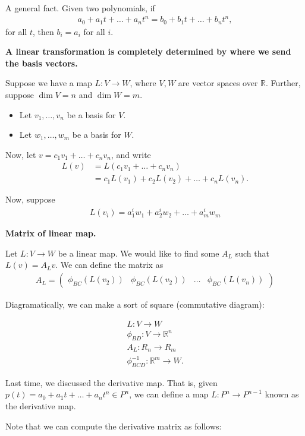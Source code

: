 \documentclass{article}
\newcommand{\mat}[1]{\begin{pmatrix}#1\end{pmatrix}}
\newcommand{\RR}{\mathbb{R}}
\begin{document}
A general fact.  Given two polynomials, if
\begin{align*}
  a_0 + a_1 t + \dots + a_n t^n = b_0 + b_1 t + \dots + b_n t^n,
\end{align*}
for all $t$, then $b_i = a_i$ for all $i$.

{\bf A linear transformation is completely determined by where we send the basis vectors.}

Suppose we have a map $L: V \to W$, where $V, W$ are vector spaces over $\RR$.  Further, suppose $\dim V = n$ and $\dim W = m$.
\begin{itemize}
  \item Let $v_1, \dots, v_n$ be a basis for $V$.
  \item Let $w_1, \dots, w_m$ be a basis for $W$.
\end{itemize}

Now, let $v = c_1 v_1 + \dots + c_n v_n$, and write
\begin{align*}
  L(v) &= L(c_1 v_1 + \dots + c_n v_n) \\
  &= c_1 L(v_1) + c_2 L(v_2) + \dots + c_n L(v_n).
\end{align*}

Now, suppose
\begin{align*}
  L(v_i) = a_1^i w_1 + a_2^i w_2 + \dots + a_m^i w_m
\end{align*}

{\bf Matrix of linear map.}

Let $L: V \to W$ be a linear map.  We would like to find some $A_L$ such that $L(v) = A_L v$.  We can define the matrix as
\begin{align*}
  A_L = \mat{\phi_{BC}(L(v_2)) & \phi_{BC}(L(v_2)) & \dots & \phi_{BC}(L(v_n))}
\end{align*}

Diagramatically, we can make a sort of square (commutative diagram):

\begin{align*}
  L: V \to W \\
  \phi_{BD}: V \to \RR^n \\
  A_L: R_n \to R_m \\
  \phi_{BCD}^{-1}: \RR^m \to W.
\end{align*}

Last time, we discussed the derivative map.  That is, given $p(t) = a_0 + a_1 t + \dots + a_n t^n \in P^n$, we can define a map $L: P^n \to P^{n-1}$ known as the derivative map.

Note that we can compute the derivative matrix as follows:
\end{document}

